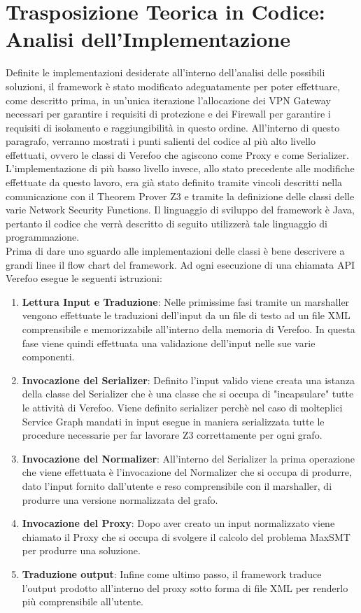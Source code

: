 \section{Trasposizione Teorica in Codice: Analisi dell'Implementazione}
Definite le implementazioni desiderate all'interno dell'analisi delle possibili soluzioni, il framework è stato modificato adeguatamente per poter effettuare, come descritto prima, in un'unica iterazione
l'allocazione dei VPN Gateway necessari per garantire i requisiti di protezione e dei Firewall per garantire i requisiti di isolamento e raggiungibilità in questo ordine. All'interno di questo paragrafo, verranno mostrati
i punti salienti del codice al più alto livello effettuati, ovvero le classi di Verefoo che agiscono come Proxy e come Serializer. L'implementazione di più basso livello invece, allo stato precedente alle modifiche effettuate da questo lavoro, era già stato definito tramite vincoli 
descritti nella comunicazione con il Theorem Prover Z3 e tramite la definizione delle classi delle varie Network Security Functions.
Il linguaggio di sviluppo del framework è Java, pertanto il codice che verrà descritto di seguito utilizzerà
tale linguaggio di programmazione. \\
Prima di dare uno sguardo alle implementazioni delle classi è bene descrivere a grandi linee il flow chart del framework. Ad ogni esecuzione di una chiamata API Verefoo esegue le seguenti istruzioni:

\begin{enumerate}
    \item \textbf{Lettura Input e Traduzione}: Nelle primissime fasi tramite un marshaller vengono effettuate le traduzioni dell'input da un file di testo ad un file XML comprensibile e memorizzabile all'interno della memoria di Verefoo. In questa fase viene quindi effettuata 
        una validazione dell'input nelle sue varie componenti.  
    \item  \textbf{Invocazione del Serializer}: Definito l'input valido viene creata una istanza della classe del Serializer che è una classe che si occupa di "incapsulare" tutte le attività di Verefoo. Viene definito serializer perchè
        nel caso di molteplici Service Graph mandati in input esegue in maniera serializzata tutte le procedure necessarie per far lavorare Z3 correttamente per ogni grafo.
    \item \textbf{Invocazione del Normalizer}: All'interno del Serializer la prima operazione che viene effettuata è l'invocazione del Normalizer che si occupa di produrre, dato l'input fornito dall'utente e reso comprensibile con il marshaller, di produrre una versione normalizzata del grafo.
    \item \textbf{Invocazione del Proxy}: Dopo aver creato un input normalizzato viene chiamato il Proxy che si occupa di svolgere il calcolo del problema MaxSMT per produrre una soluzione.
    \item \textbf{Traduzione output}: Infine come ultimo passo, il framework traduce l'output prodotto all'interno del proxy sotto forma di file XML per renderlo più comprensibile all'utente.
\end{enumerate}


